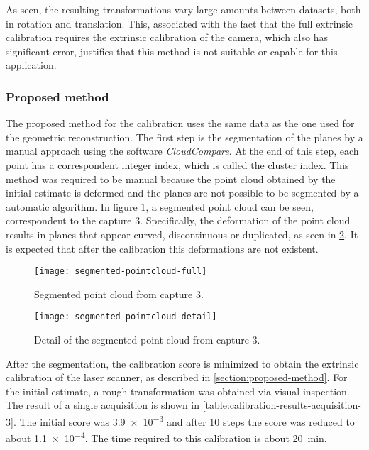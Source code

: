 As seen, the resulting transformations vary large amounts between datasets, both in rotation and translation. This, associated with the fact that the full extrinsic calibration requires the extrinsic calibration of the camera, which also has significant error, justifies that this method is not suitable or capable for this application. 

\subsubsection{Proposed method}

The proposed method for the calibration uses the same data as the one used for the geometric reconstruction. The first step is the segmentation of the planes by a manual approach using the software \textit{CloudCompare}. At the end of this step, each point has a correspondent integer index, which is called the cluster index. This method was required to be manual because the point cloud obtained by the initial estimate is deformed and the planes are not possible to be segmented by a automatic algorithm. In figure \cref{figure:segmented-pointcloud-full}, a segmented point cloud can be seen, correspondent to the capture 3. Specifically, the deformation of the point cloud results in planes that appear curved, discontinuous or duplicated, as seen in \cref{figure:segmented-pointcloud-detail}. It is expected that after the calibration this deformations are not existent.

\begin{figure}[h]
    
    \centering
    \texttt{[image: segmented-pointcloud-full]}
    \caption{Segmented point cloud from capture 3.}
    \label{figure:segmented-pointcloud-full}

\end{figure}

\begin{figure}[h]
    \centering
    \texttt{[image: segmented-pointcloud-detail]}
    \caption{Detail of the segmented point cloud from capture 3.}
    \label{figure:segmented-pointcloud-detail}

\end{figure}

After the segmentation, the calibration score is minimized to obtain the extrinsic calibration of the laser scanner, as described in \cref{section:proposed-method}. For the initial estimate, a rough transformation was obtained via visual inspection. The result of a single acquisition is shown in \cref{table:calibration-results-acquisition-3}. The initial score was \num{3.9e-3} and after 10 steps the score was reduced to about \num{1.1e-4}. The time required to this calibration is about \SI{20}{\minute}.

